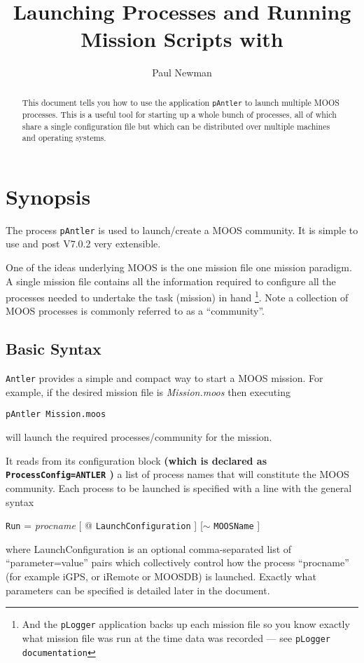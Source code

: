 \documentclass[a4paper,10pt]{article}
\title{Launching Processes and Running Mission Scripts with \code{pAntler}}
\author{Paul Newman}
\newcommand{\Code}[1]{\texttt{#1} }
\newcommand{\code}[1]{\Code{#1} }
\begin{document}
\maketitle

\begin{center}
\end{center}


\begin{abstract}
This document tells you how to use the application \code{pAntler} to launch multiple MOOS processes. This is a useful tool for starting up a whole bunch of processes, all of which share a single configuration file but which can be distributed over multiple machines and operating systems.
\end{abstract}

\newpage
\tableofcontents
\newpage

\section{Synopsis}
The process \code{pAntler} is used to launch/create a MOOS
community. It is  simple to use and post V7.0.2 very extensible.

One of the ideas underlying MOOS is the one mission file one mission paradigm. A single mission file contains all the information required to configure all the processes needed to undertake the task (mission) in hand \footnote{And the \code{pLogger} application backs up each mission file so you know exactly what mission file was run at the time data was recorded --- see \code{pLogger documentation}}.  Note a collection of MOOS processes is commonly referred to as a ``community''.


\subsection{Basic Syntax}

\code{Antler} provides a simple and compact way to start a MOOS mission. For example, if the desired mission file is
{\it{Mission.moos}} then executing
\begin{center}
\code{pAntler Mission.moos}
\end{center}
will launch the required processes/community for the  mission.

It reads from its configuration block {\textbf{(which is declared as  \code{ProcessConfig=ANTLER})}} a list of process names that will constitute
the MOOS community. Each process to be launched is specified with a line with the general syntax
\begin{center}
{\code{Run}} = {\it{procname}} [ @ \code{LaunchConfiguration}] [$\sim$ \code{MOOSName}]
\end{center}
where LaunchConfiguration is an optional  comma-separated list of ``parameter=value'' pairs which collectively control how the process ``procname'' (for example iGPS, or iRemote or MOOSDB) is launched. Exactly what parameters can be specified is detailed later in the document.
\end{document}
